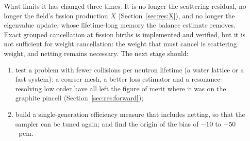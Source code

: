 What limits it has changed three times. It is no longer the scattering residual, no longer the
field's fission production $X$ (Section~\ref{sec:res:X}), and no longer the eigenvalue update, whose
lifetime-long memory the balance estimate removes. Exact grouped cancellation at fission births is
implemented and verified, but it is not sufficient for weight cancellation: the weight that must
cancel is scattering weight, and netting remains necessary. The next stage should:
\begin{enumerate}
\item test a problem with fewer collisions per neutron lifetime (a water lattice or a fast system):
  a coarser mesh, a better loss estimator and a resonance-resolving low order have all left the
  figure of merit where it was on the graphite pincell (Section~\ref{sec:res:forward});
\item build a single-generation efficiency measure that includes netting, so that the sampler can be
  tuned again; and find the origin of the bias of $-10$ to $-50$~pcm.
\end{enumerate}
